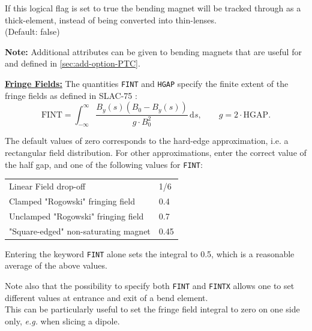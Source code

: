 \begin{madlist}

    If this logical flag is set to true the bending 
   magnet will be tracked through as a thick-element, instead of being
   converted into thin-lenses. \\
   (Default: false)
\end{madlist}

\textbf{Note:} Additional attributes can be given to bending magnets that
are useful for \ptc and defined in \ref{sec:add-option-PTC}.

\vskip 5mm
\textbf{\underline{Fringe Fields:}}
\vskip 3mm
The quantities \texttt{FINT} and \texttt{HGAP} specify the finite extent
of the fringe fields as defined in SLAC-75 \cite{slac75}:
\begin{equation}
\mathrm{FINT}=\int_{-\infty}^\infty \frac{B_y(s)(B_0-B_y(s))}{g \cdot
  B_0^2}\,\mathrm{d}s ,\quad\quad g=2\cdot \mathrm{HGAP}. 
\end{equation}

The default values of zero corresponds to the hard-edge approximation,
i.e. a rectangular field distribution. For other approximations, enter
the correct value of the half gap, and one of the following values for
\texttt{FINT}: 
 
\begin{center}
  \begin{tabular}{l l}
    Linear Field drop-off                   &  1/6 \\
    Clamped "Rogowski" fringing field       &  0.4 \\
    Unclamped "Rogowski" fringing field     &  0.7 \\
    "Square-edged" non-saturating magnet    &  0.45
  \end{tabular}
\end{center}


Entering the keyword \texttt{FINT} alone sets the integral to 0.5, which is a
reasonable average of the above values.  

Note also that the possibility to specify both \texttt{FINT} and
\texttt{FINTX} allows one to set different values at entrance and exit
of a bend element. \\  
This can be particularly useful to set the fringe field integral to zero
on one side only, \textsl{e.g.} when slicing a dipole.  


